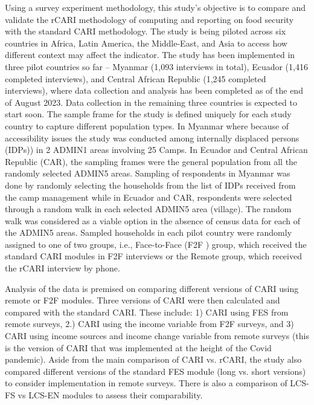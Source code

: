 \documentclass[11pt,harvard]{article}
\begin{document}
Using a survey experiment methodology, this study's objective is to compare and validate the rCARI methodology of computing and reporting on food security with the standard CARI methodology. The study is being piloted across six countries in Africa, Latin America, the Middle-East, and Asia to access how different context may affect the indicator. The study has been implemented in three pilot countries so far – Myanmar (1,093 interviews in total), Ecuador (1,416 completed interviews), and Central African Republic (1,245 completed interviews), where data collection and analysis has been completed as of the end of August 2023. Data collection in the remaining three countries is expected to start soon. The sample frame for the study is defined uniquely for each study country to capture different population types. In Myanmar where because of accessibility issues the study was conducted among internally displaced persons (IDPs)) in 2 ADMIN1 areas involving 25 Camps. In Ecuador and Central African Republic (CAR), the sampling frames were the general population from all the randomly selected ADMIN5 areas. Sampling of respondents in Myanmar was done by randomly selecting the households from the list of IDPs received from the camp management while in Ecuador and CAR, respondents were selected through a random walk in each selected ADMIN5 area (village). The random walk was considered as a viable option in the absence of census data for each of the ADMIN5 areas. Sampled households in each pilot country were randomly assigned to one of two groups, i.e., Face-to-Face (F2F ) group, which received the standard CARI modules in F2F interviews or the Remote group, which received the rCARI interview by phone. 

Analysis of the data is premised on comparing different versions of CARI using remote or F2F modules. Three versions of CARI were then calculated and compared with the standard CARI. These include: 1) CARI using FES from remote surveys, 2.) CARI using the income variable from F2F surveys, and 3) CARI using income sources and income change variable from remote surveys (this is the version of CARI that was implemented at the height of the Covid pandemic).  Aside from the main comparison of CARI vs. rCARI, the study also compared different versions of the standard FES module (long vs. short versions) to consider implementation in remote surveys. There is also a comparison of LCS-FS vs LCS-EN modules to assess their comparability.
\end{document}
